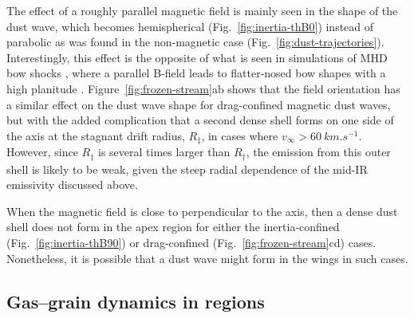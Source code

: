 The effect of a roughly parallel magnetic field is mainly seen in the
shape of the dust wave, which becomes hemispherical
(Fig.~\ref{fig:inertia-thB0}) instead of parabolic as was found in the
non-magnetic case (Fig.~\ref{fig:dust-trajectories}).  Interestingly,
this effect is the opposite of what is seen in simulations of MHD bow
shocks \citep{Meyer:2016a}, where a parallel B-field leads to
flatter-nosed bow shapes with a high planitude \citetext{see Fig.~25
  of \citealp{Tarango-Yong:2018a}}.  Figure~\ref{fig:frozen-stream}ab
shows that the field orientation has a similar effect on the dust wave
shape for drag-confined magnetic dust waves, but with the added
complication that a second dense shell forms on one side of the axis
at the stagnant drift radius, \(R_\ddag\), in cases where
\(v_\infty > \SI{60}{km.s^{-1}}\).  However, since \(R_\ddag\) is several times
larger than \(R_\dag\), the emission from this outer shell is likely to
be weak, given the steep radial dependence of the mid-IR emissivity
discussed above.

When the magnetic field is close to perpendicular to the axis, then a
dense dust shell does not form in the apex region for either the
inertia-confined (Fig.~\ref{fig:inertia-thB90}) or drag-confined
(Fig.~\ref{fig:frozen-stream}cd) cases.  Nonetheless, it is possible
that a dust wave might form in the wings in such cases.

\subsection{Gas--grain dynamics in \hii{} regions}
\label{sec:gas-grain-dynamics-hii}

